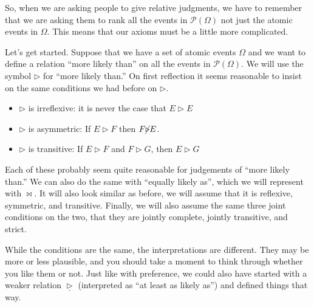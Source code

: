 So, when we are asking people to give relative judgments, we have to remember that we are asking them to rank all the events in $\mathscr{P}(\Omega)$ not just the atomic events in $\Omega$. This means that our axioms must be a little more complicated.

Let's get started.  Suppose that we have a set of atomic events $\Omega$ and we want to define a relation ``more likely than'' on all the events in $\mathscr{P}(\Omega)$.  We will use the symbol $\triangleright$ for ``more likely than.''  On first reflection it seems reasonable to insist on the same conditions we had before on $\triangleright$.


\begin{itemize}
    \item $\triangleright$ is irreflexive: it is never the case that $E \triangleright E$ 
    \item $\triangleright$ is asymmetric: If $E \triangleright F$ then $F \cancel{\triangleright} E$.  
    \item $\triangleright$ is transitive: If $E \triangleright F$ and $F \triangleright G$, then $E \triangleright G$
\end{itemize}



Each of these probably seem quite reasonable for judgements of ``more likely than.''   We can also do the same with ``equally likely as'', which we will represent with $\bowtie$. It will also look similar as before, we will assume that it is reflexive, symmetric, and transitive.  Finally, we will also assume the same three joint conditions on the two, that they are jointly complete, jointly transitive, and strict.


While the conditions are the same, the interpretations are different.  They may be more or less plausible, and you should take a moment to think through whether you like them or not.  Just like with preference, we could also have started with a weaker relation $\underline\triangleright$ (interpreted as ``at least as likely as'') and defined things that way.  

